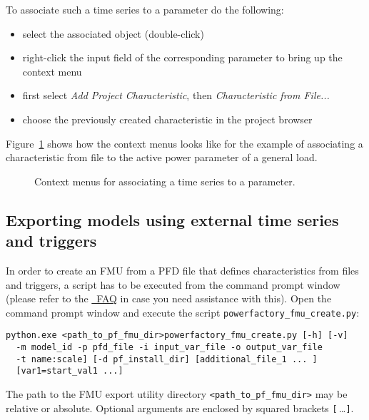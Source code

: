 
To associate such a time series to a parameter do the following:
\begin{itemize}
  \item select the associated object (double-click)
  \item right-click the input field of the corresponding parameter to bring up the context menu
  \item first select \emph{Add Project Characteristic}, then \emph{Characteristic from File...}
  \item choose the previously created characteristic in the project browser
\end{itemize} 
Figure~\ref{fig:add_characteristics_from_file} shows how the context menus looks like for the example of associating a characteristic from file to the active power parameter of a general load.

\begin{figure}[h!]
\vspace*{2em}
\caption{Context menus for associating a time series to a parameter.}
\label{fig:add_characteristics_from_file}
\end{figure}

\clearpage

\subsection{Exporting models using external time series and triggers}

In order to create an FMU from a PFD file that defines characteristics from files and triggers, a \python script has to be executed from the command prompt window (please refer to the \href{https://docs.python.org/2/faq/windows.html}{\python~FAQ} in case you need assistance with this).
Open the command prompt window and execute the script \texttt{powerfactory\_fmu\_create.py}:

\begin{verbatim}
python.exe <path_to_pf_fmu_dir>powerfactory_fmu_create.py [-h] [-v] 
  -m model_id -p pfd_file -i input_var_file -o output_var_file
  -t name:scale] [-d pf_install_dir] [additional_file_1 ... ]
  [var1=start_val1 ...]
\end{verbatim}

The path to the \fmipp \pf FMU export utility directory \verb!<path_to_pf_fmu_dir>! may be relative or absolute.
Optional arguments are enclosed by squared brackets \verb![!$\,$\ldots\verb!]!.
  
